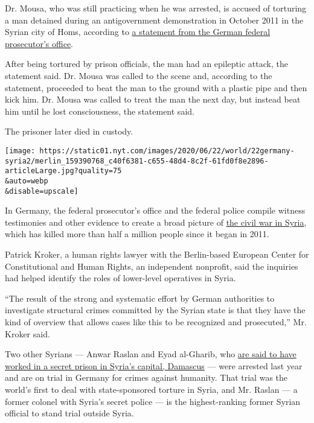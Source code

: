 Dr. Mousa, who was still practicing when he was arrested, is accused of
torturing a man detained during an antigovernment demonstration in
October 2011 in the Syrian city of Homs, according to
\href{https://www.generalbundesanwalt.de/SharedDocs/Pressemitteilungen/DE/aktuelle/Pressemitteilung-vom-22-06-2020.html;jsessionid=BA8A3B5E3F218468ECCE68602B83CC80.intranet251}{a
statement from the German federal prosecutor's office}.

After being tortured by prison officials, the man had an epileptic
attack, the statement said. Dr. Mousa was called to the scene and,
according to the statement, proceeded to beat the man to the ground with
a plastic pipe and then kick him. Dr. Mousa was called to treat the man
the next day, but instead beat him until he lost consciousness, the
statement said.

The prisoner later died in custody.

\texttt{[image: https://static01.nyt.com/images/2020/06/22/world/22germany-syria2/merlin\_159390768\_c40f6381-c655-48d4-8c2f-61fd0f8e2896-articleLarge.jpg?quality=75\\\&auto=webp\\\&disable=upscale]}

In Germany, the federal prosecutor's office and the federal police
compile witness testimonies and other evidence to create a broad picture
of
\href{https://www.nytimes.com/2016/08/27/world/middleeast/syria-civil-war-why-get-worse.html}{the
civil war in Syria}, which has killed more than half a million people
since it began in 2011.

Patrick Kroker, a human rights lawyer with the Berlin-based European
Center for Constitutional and Human Rights, an independent nonprofit,
said the inquiries had helped identify the roles of lower-level
operatives in Syria.

``The result of the strong and systematic effort by German authorities
to investigate structural crimes committed by the Syrian state is that
they have the kind of overview that allows cases like this to be
recognized and prosecuted,'' Mr. Kroker said.

Two other Syrians --- Anwar Raslan and Eyad al-Gharib, who
\href{https://www.nytimes.com/2020/04/23/world/middleeast/syria-germany-war-crimes-trial.html?searchResultPosition=2}{are
said to have worked in a secret prison in Syria's capital, Damascus} ---
were arrested last year and are on trial in Germany for crimes against
humanity. That trial was the world's first to deal with state-sponsored
torture in Syria, and Mr. Raslan --- a former colonel with Syria's
secret police --- is the highest-ranking former Syrian official to stand
trial outside Syria.

